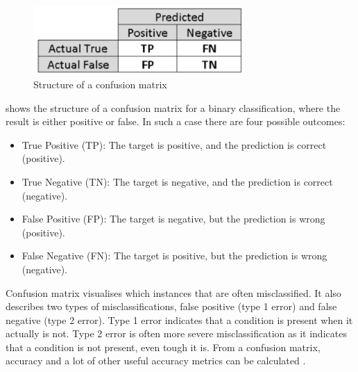 \documentclass[english, a4paper]{report}
\begin{document}
{{{{                \begin{figure}[H]
                    \centering
                    \includegraphics[width=8cm]{ConfusionMatrix}
                    \caption{Structure of a confusion matrix \cite{evaluateML}}
                    \label{fig:ConfusionMatrix}
                \end{figure}
                
                 shows the structure of a confusion matrix for a binary classification, where the result is either positive or false. In such a case there are four possible outcomes:
                
                \begin{itemize}
                    \item True Positive (TP): The target is positive, and the prediction is correct (positive). 
                    \item True Negative (TN): The target is negative, and the prediction is correct (negative).
                    \item False Positive (FP): The target is negative, but the prediction is wrong (positive).
                    \item False Negative (FN): The target is positive, but the prediction is wrong (negative).
                \end{itemize}
                
                Confusion matrix visualises which instances that are often misclassified. It also describes two types of misclassifications, false positive (type 1 error) and false negative (type 2 error). Type 1 error indicates that a condition is present when it actually is not. Type 2 error is often more severe misclassification as it indicates that a condition is not present, even tough it is. From a confusion matrix, accuracy and a lot of other useful accuracy metrics can be calculated \cite{mlMarsland}.
            }
            
}}}
\end{document}
